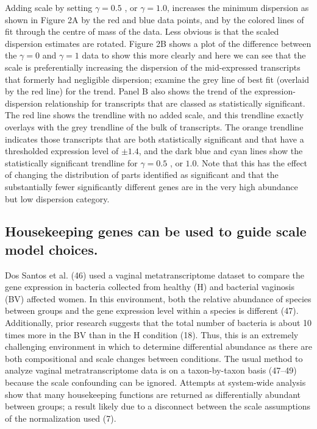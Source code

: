 \documentclass[
]{article}
\begin{document}
Adding scale by setting \(\gamma=0.5\) , or \(\gamma = 1.0\), increases
the minimum dispersion as shown in Figure 2A by the red and blue data
points, and by the colored lines of fit through the centre of mass of
the data. Less obvious is that the scaled dispersion estimates are
rotated. Figure 2B shows a plot of the difference between the
\(\gamma= 0\) and \(\gamma= 1\) data to show this more clearly and here
we can see that the scale is preferentially increasing the dispersion of
the mid-expressed transcripts that formerly had negligible dispersion;
examine the grey line of best fit (overlaid by the red line) for the
trend. Panel B also shows the trend of the expression-dispersion
relationship for transcripts that are classed as statistically
significant. The red line shows the trendline with no added scale, and
this trendline exactly overlays with the grey trendline of the bulk of
transcripts. The orange trendline indicates those transcripts that are
both statistically significant and that have a thresholded expression
level of \(\pm 1.4\), and the dark blue and cyan lines show the
statistically significant trendline for \(\gamma=0.5\) , or \(1.0\).
Note that this has the effect of changing the distribution of parts
identified as significant and that the substantially fewer significantly
different genes are in the very high abundance but low dispersion
category.

\subsection{Housekeeping genes can be used to guide scale model
choices.}\label{housekeeping-genes-can-be-used-to-guide-scale-model-choices.}

Dos Santos et al. (46) used a vaginal metatranscriptome dataset to
compare the gene expression in bacteria collected from healthy (H) and
bacterial vaginosis (BV) affected women. In this environment, both the
relative abundance of species between groups and the gene expression
level within a species is different (47). Additionally, prior research
suggests that the total number of bacteria is about 10 times more in the
BV than in the H condition (18). Thus, this is an extremely challenging
environment in which to determine differential abundance as there are
both compositional and scale changes between conditions. The usual
method to analyze vaginal metratranscriptome data is on a taxon-by-taxon
basis (47--49) because the scale confounding can be ignored. Attempts at
system-wide analysis show that many housekeeping functions are returned
as differentially abundant between groups; a result likely due to a
disconnect between the scale assumptions of the normalization used (7).
\end{document}
